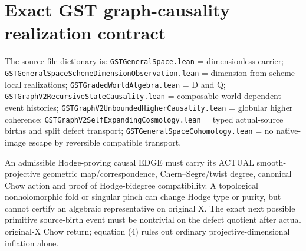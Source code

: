 \documentclass[11pt]{article}
\begin{document}
\section{Exact GST graph-causality realization contract}
The source-file dictionary is:
\texttt{GSTGeneralSpace.lean} = dimensionless carrier;
\texttt{GSTGeneralSpaceSchemeDimensionObservation.lean}
= dimension from scheme-local realizations;
\texttt{GSTGradedWorldAlgebra.lean} = D and Q;
\texttt{GSTGraphV2RecursiveStateCausality.lean}
= composable world-dependent event histories;
\texttt{GSTGraphV2UnboundedHigherCausality.lean}
= globular higher coherence;
\texttt{GSTGraphV2SelfExpandingCosmology.lean}
= typed actual-source births and split defect transport;
\texttt{GSTGeneralSpaceCohomology.lean}
= no native-image escape by reversible compatible transport.

An admissible Hodge-proving causal EDGE must carry
its ACTUAL smooth-projective geometric map/correspondence,
Chern--Segre/twist degree, canonical Chow action and
proof of Hodge-bidegree compatibility.
A topological nonholomorphic fold or singular pinch
can change Hodge type or purity, but cannot certify
an algebraic representative on original X.
The exact next possible primitive source-birth event
must be nontrivial on the defect quotient after
actual original-X Chow return; equation (4)
rules out ordinary projective-dimensional inflation alone.
\end{document}
